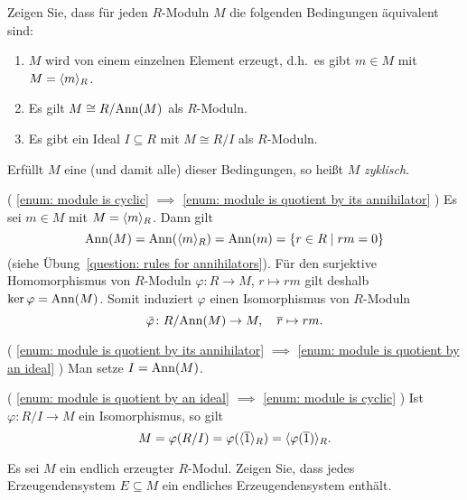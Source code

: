 \begin{question}[subtitle = Charakterisierung zyklischer Moduln]
  Zeigen Sie, dass für jeden $R$-Moduln $M$ die folgenden Bedingungen äquivalent sind:
  \begin{enumerate}
    \item
      \label{enum: module is cyclic}
      $M$ wird von einem einzelnen Element erzeugt, d.h.\ es gibt $m \in M$ mit $M = \langle m\rangle_R$.
    \item
      \label{enum: module is quotient by its annihilator}
      Es gilt $M \cong R/\!\operatorname{Ann}(M)$ als $R$-Moduln.
    \item
      \label{enum: module is quotient by an ideal}
      Es gibt ein Ideal $I \subseteq R$ mit $M \cong R/I$ als $R$-Moduln.
  \end{enumerate}
  Erfüllt $M$ eine (und damit alle) dieser Bedingungen, so heißt $M$ \emph{zyklisch}.
\end{question}


\begin{solution}
  (
    \ref{enum: module is cyclic}
    $\implies$
    \ref{enum: module is quotient by its annihilator}
  )
  Es sei $m \in M$ mit $M = \langle m\rangle_R$.
  Dann gilt
  \[
      \operatorname{Ann}(M)
    = \operatorname{Ann}(\langle m\rangle_R)
    = \operatorname{Ann}(m)
    = \{r \in R \mid rm = 0\}
  \]
  (siehe Übung~\ref{question: rules for annihilators}).
  Für den surjektive Homomorphismus von $R$-Moduln $\varphi \colon R \to M$, $r \mapsto rm$ gilt deshalb $\ker \varphi = \operatorname{Ann}(M)$.
  Somit induziert $\varphi$ einen Isomorphismus von $R$-Moduln
  \[
            \bar{\varphi}
    \colon  R/{\operatorname{Ann}(M)} \to M,
    \quad
            \overline{r} \mapsto rm.
  \]
  
  (
    \ref{enum: module is quotient by its annihilator}
    $\implies$
    \ref{enum: module is quotient by an ideal}
  )
  Man setze $I = \operatorname{Ann}(M)$.
  
  (
    \ref{enum: module is quotient by an ideal}
    $\implies$
    \ref{enum: module is cyclic}
  )
  Ist $\varphi \colon R/I \to M$ ein Isomorphismus, so gilt
  \[
      M
    = \varphi(R/I)
    = \varphi(\langle\overline{1}\rangle_R)
    = \langle\varphi(\overline{1})\rangle_R.
  \]
\end{solution}


\begin{question}[subtitle = Existenz endlicher Erzeugendensysteme]
  \label{question: in a finitely generated module every generating set contains a finite generatin set}
  Es sei $M$ ein endlich erzeugter $R$-Modul.
  Zeigen Sie, dass jedes Erzeugendensystem $E \subseteq M$ ein endliches Erzeugendensystem enthält.
\end{question}


